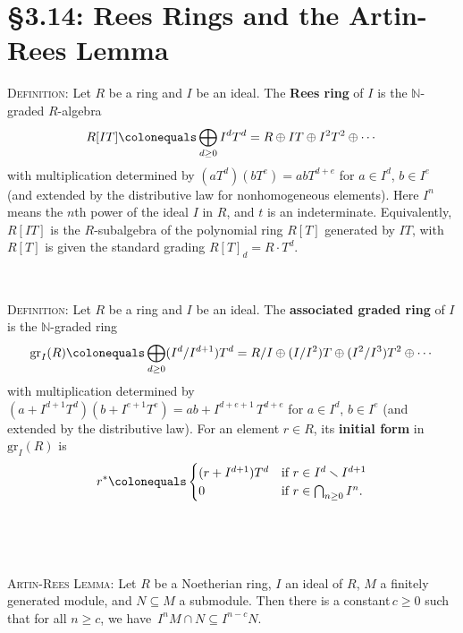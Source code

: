 \documentclass[12pt]{amsart}
\newcommand{\N}{\mathbb{N}}
\newcommand{\1}{\mathbbm{1}}
\newcommand{\showsol}[1]{\def\displaysol{#1}}
\newcommand\ceq{\colonequals}
\begin{document}
\showsol{1}
	
	\thispagestyle{empty}
	
	\section*{\S3.14: Rees Rings and the Artin-Rees Lemma}	

\begin{framed}

\noindent \textsc{Definition:} Let $R$ be a ring and $I$ be an ideal.
The \textbf{Rees ring} of $I$ is the $\N$-graded $R$-algebra
\[  R[IT] \ceq \bigoplus_{d\geq 0} I^d T^d = R \oplus I T \oplus I^2 T^2 \oplus \cdots \]
with multiplication determined by $(a T^d)(b T^e) = ab T^{d+e}$ for $a\in I^d$, $b\in I^e$ (and extended by the distributive law for nonhomogeneous elements). Here $I^n$ means the $n$th power of the ideal $I$ in $R$, and $t$ is an indeterminate. Equivalently, $R[IT]$ is the $R$-subalgebra of the polynomial ring $R[T]$ generated by $IT$, with $R[T]$ is given the standard grading $R[T]_d = R \cdot T^d$.

\

\noindent \textsc{Definition:} Let $R$ be a ring and $I$ be an ideal.
The \textbf{associated graded ring} of $I$ is the $\N$-graded ring
\[ \mathrm{gr}_I(R) \ceq \bigoplus_{d\geq 0} (I^d / I^{d+1}) T^d = R/I \oplus (I/I^2) T \oplus (I^2/I^3) T^2 \oplus \cdots \]
with multiplication determined by $(a+I^{d+1} T^d)(b + I^{e+1} T^e) = ab+I^{d+e+1} \, T^{d+e}$ for $a\in I^d$, $b\in I^e$ (and extended by the distributive law).
For an element $r\in R$, its \textbf{initial form} in $\mathrm{gr}_I(R)$ is
\[ r^* \ceq \begin{cases} (r+ I^{d+1})T^d &\text{if} \ r\in I^d \smallsetminus I^{d+1} \\ 0 &\text{if} \ r\in \bigcap_{n\geq 0} I^n.\end{cases}\]

\

\

\noindent \textsc{Artin-Rees Lemma:} Let $R$ be a Noetherian ring, $I$ an ideal of $R$, $M$ a finitely generated module, and $N\subseteq M$ a submodule. Then there is a constant\footnotemark\,$c\geq 0$ such that for all $n\geq c$, we have~${I^{n} M \cap N \subseteq I^{n-c} N}$.

 \end{framed}
 
\end{document}
